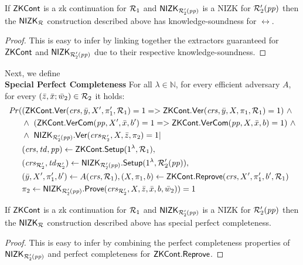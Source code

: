 \begin{lemma} 
\label{le:KS_for_nizkR}
If ${\mathsf{ZKCont}}$ is a zk continuation for $\mathcal{R}_1$ and ${\mathsf{NIZK_{\mathcal{R}'_2(\mathit{pp})}}}$ is a NIZK for $\mathcal{R}_2'(\mathit{pp})$ 
then the ${\mathsf{NIZK_{\mathcal{R}}}}$ construction described above has knowledge-soundness for $\rel$. 
\end{lemma} 
\begin{proof}This is easy to infer by linking together the extractors guaranteed for ${\mathsf{ZKCont}}$ and ${\mathsf{NIZK_{\mathcal{R}'_2(\mathit{pp})}}}$ due to their respective 
knowledge-soundness.
\end{proof}
 
\noindent Next, we define \\ 
\noindent \textbf{Special Perfect Completeness} For all $\lambda \in \mathbb{N}$, for every efficient adversary $A$, for every 
 $(\bar{z}, \bar{x}; \bar{w}_2) \in \mathcal{R}_2$ it holds: 
\begin{align*}
\mathit{Pr} (& (\ZKCont.\Verify(\crs, \bar{y}, X', \pi'_1, \relone) = 1  = >  \ZKCont.\Verify(\crs, \bar{y}, X, \pi_1, \relone) = 1)  \ \wedge \  \\
                   & \wedge \ (\ZKCont.\VerifyCom (\pp, X', \barx, b') = 1 => \ZKCont.\VerifyCom (\pp, X, \barx, b) = 1) \ \wedge \\
                   & \wedge \ \nizktwo.\Verify(\crstwo, X, \barz, \pi_2) =1 | \\
                   & (\crs, \tw, \pp) \leftarrow \ZKCont.\Setup (1^{\lambda}, \relone),  \\ 
                   & (\crstwo, \twtwo) \leftarrow \nizktwo.\Setup(1^{\lambda}, \reltwo'(\pp)),  \\
                   & (\bary, X', \pi'_1, b') \leftarrow A(\crs,\relone), (X, \pi_1, b) \leftarrow \ZKCont.\Reprove(\crs, X', \pi'_1, b', \relone) \\
                   &\pi_2 \leftarrow \nizktwo.\Prove(\crstwo, X, \barz, \barx, b, \baromega_2)) = 1
\end{align*}

\begin{lemma} 
\label{le:specialCompl_for_nizkR}
If ${\mathsf{ZKCont}}$ is a zk continuation for $\mathcal{R}_1$ and ${\mathsf{NIZK_{\mathcal{R}'_2(\mathit{pp})}}}$ is a NIZK for $\mathcal{R}_2'(\mathit{pp})$ 
then the ${\mathsf{NIZK_{\mathcal{R}}}}$ construction described above has special perfect completeness.
\end{lemma} 
\begin{proof} This is easy to infer by combining the perfect completeness properties of ${\mathsf{NIZK_{\mathcal{R}'_2(\mathit{pp})}}}$ and perfect completeness 
for ${\mathsf{ZKCont}}.{\mathsf{Reprove}}$.
\end{proof}

